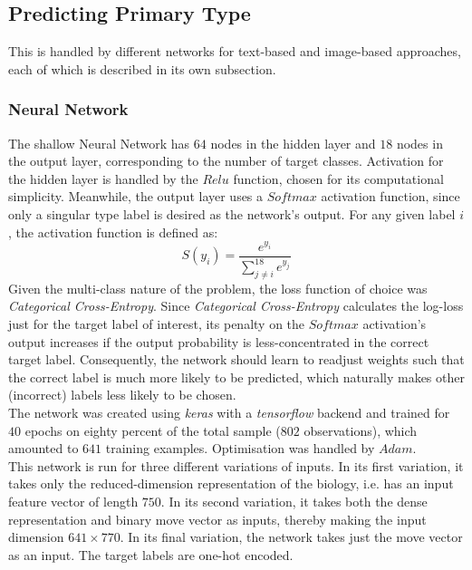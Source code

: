 \documentclass{winnower}
\begin{document}
\subsection{Predicting Primary Type}
This is handled by different networks for text-based and image-based approaches, each of which is described in its own subsection.
\subsubsection{Neural Network}
The shallow Neural Network has $64$ nodes in the hidden layer and $18$ nodes in the output layer, corresponding to the number of target classes. Activation for the hidden layer is handled by the $Relu$ function, chosen for its computational simplicity. Meanwhile, the output layer uses a $Softmax$ activation function, since only a singular type label is desired as the network's output. For any given label $i$, the activation function is defined as:
\begin{equation*}
S(y_{i}) = \frac{e^{y_{i}}}{\sum_{j\neq i}^{18} e^{y_{j}}}
\end{equation*}Given the multi-class nature of the problem, the loss function of choice was \emph{Categorical Cross-Entropy}. Since \textit{Categorical Cross-Entropy} calculates the log-loss just for the target label of interest, its penalty on the $Softmax$ activation's output increases if the output probability is less-concentrated in the correct target label. Consequently, the network should learn to readjust weights such that the correct label is much more likely to be predicted, which naturally makes other (incorrect) labels less likely to be chosen. \\

The network was created using \emph{keras} with a \emph{tensorflow} backend and trained for $40$ epochs on eighty percent of the total sample ($802$ observations), which amounted to $641$ training examples. Optimisation was handled by $Adam$. \\

This network is run for three different variations of inputs. In its first variation, it takes only the reduced-dimension representation of the biology, i.e. has an input feature vector of length $750$. In its second variation, it takes both the dense representation and binary move vector as inputs, thereby making the input dimension $641 \times 770$. In its final variation, the network takes just the move vector as an input. The target labels are one-hot encoded.
\end{document}
